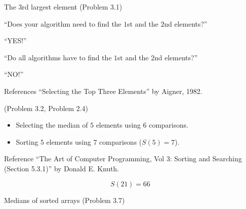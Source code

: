 \begin{frame}{The 3rd largest element (Problem 3.1)}
  \begin{center}
	``Does your algorithm need to find the $1$st and the $2$nd elements?'' \\[0.30cm] \pause

	``YES!''
  \end{center}

  \pause
  \begin{center}
	``Do all algorithms have to find the $1$st and the $2$nd elements?'' \\[0.30cm] \pause

	``NO!''
  \end{center}

  \pause
  \begin{alertblock}{References}
	``Selecting the Top Three Elements'' by Aigner, 1982.
  \end{alertblock}


\end{frame}
\begin{frame}{(Problem 3.2, Problem 2.4)}
  \begin{itemize}
	\item Selecting the median of $5$ elements using $6$ comparisons.
	\item Sorting $5$ elements using $7$ comparisons ($S(5) = 7$).
  \end{itemize}

  \pause
  \begin{alertblock}{Reference}
	``The Art of Computer Programming, Vol 3: Sorting and Searching (Section 5.3.1)'' by Donald E. Knuth.
  \end{alertblock}

  \[
	S(21) = 66
  \]
\end{frame}
\begin{frame}{Medians of sorted arrays (Problem 3.7)}

\end{frame}
